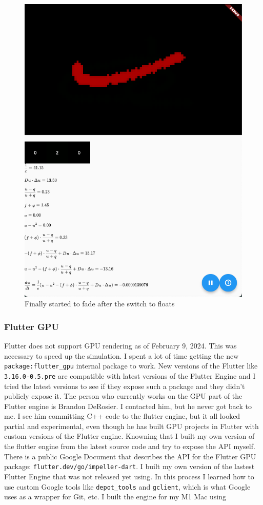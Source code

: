 \begin{figure}
    \centering
    \includegraphics[width=0.5\linewidth]{after-int-fix.png}
    \caption{Finally started to fade after the switch to floats}
    \label{fig:after-int-fix}
\end{figure}

\subsubsection{Flutter GPU}
Flutter does not support GPU rendering as of February 9, 2024. This was necessary to speed up the simulation. I spent a lot of time getting the new \verb|package:flutter_gpu| internal package to work. 
New versions of the Flutter like \verb|3.16.0-0.5.pre| are compatible with latest versions of the Flutter Engine and I tried the latest versions to see if they expose such a package and they didn't publicly expose it. 
The person who currently works on the GPU part of the Flutter engine is Brandon DeRosier. I contacted him, but he never got back to me. I see him committing C++ code to the flutter engine, but it all looked partial and experimental, even though he has built GPU projects in Flutter with custom versions of the Flutter engine. Knowning that I built my own version of the flutter engine from the latest source code and try to expose the API myself. There is a public Google Document that describes the API for the Flutter GPU package: \verb|flutter.dev/go/impeller-dart|. 
I built my own version of the lastest Flutter Engine that was not released yet using. In this process I learned how to use custom Google tools like \verb|depot_tools| and \verb|gclient|, which is what Google uses as a wrapper for Git, etc. 
I built the engine for my M1 Mac using 

